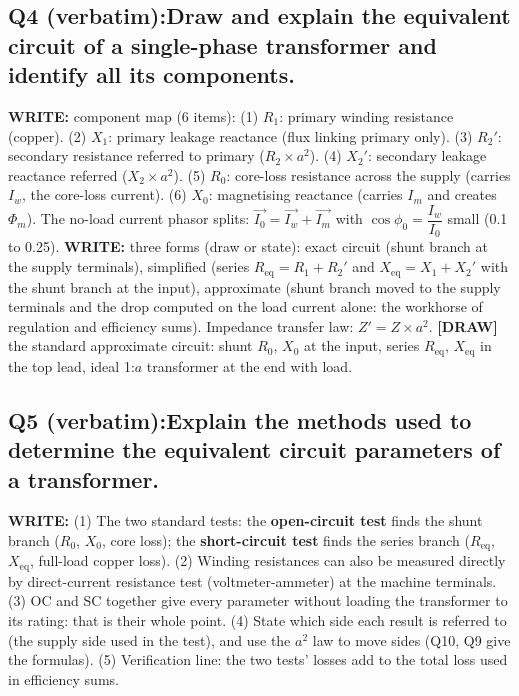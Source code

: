 \documentclass[11pt]{article}
\newcommand{\q}[2]{\subsection*{\color{copper}#1\quad\color{iron}#2}}
\newcommand{\w}[1]{\textbf{\color{copper}WRITE:} #1}
\newcommand{\dw}[1]{\textbf{\color{muted}[DRAW]} #1}
\begin{document}
\q{Q4 (verbatim):}{Draw and explain the equivalent circuit of a single-phase transformer and identify all its components.}
\w{component map (6 items):} (1) $R_1$: primary winding resistance (copper). (2) $X_1$: primary leakage reactance (flux linking primary only). (3) $R_2'$: secondary resistance referred to primary ($R_2 \times a^{2}$). (4) $X_2'$: secondary leakage reactance referred ($X_2 \times a^{2}$). (5) $R_0$: core-loss resistance across the supply (carries $I_w$, the core-loss current). (6) $X_0$: magnetising reactance (carries $I_m$ and creates $\Phi_m$). The no-load current phasor splits: $\vec{I_0} = \vec{I_w} + \vec{I_m}$ with $\cos\phi_0 = \dfrac{I_w}{I_0}$ small (0.1 to 0.25).
\w{three forms (draw or state):} exact circuit (shunt branch at the supply terminals), simplified (series $R_{\text{eq}} = R_1 + R_2'$ and $X_{\text{eq}} = X_1 + X_2'$ with the shunt branch at the input), approximate (shunt branch moved to the supply terminals and the drop computed on the load current alone: the workhorse of regulation and efficiency sums). Impedance transfer law: $Z' = Z \times a^{2}$.
\dw{the standard approximate circuit: shunt $R_0$, $X_0$ at the input, series $R_{\text{eq}}$, $X_{\text{eq}}$ in the top lead, ideal 1:$a$ transformer at the end with load.}

\q{Q5 (verbatim):}{Explain the methods used to determine the equivalent circuit parameters of a transformer.}
\w{(1) The two standard tests: the \textbf{open-circuit test} finds the shunt branch ($R_0$, $X_0$, core loss); the \textbf{short-circuit test} finds the series branch ($R_{\text{eq}}$, $X_{\text{eq}}$, full-load copper loss). (2) Winding resistances can also be measured directly by direct-current resistance test (voltmeter-ammeter) at the machine terminals. (3) OC and SC together give every parameter without loading the transformer to its rating: that is their whole point. (4) State which side each result is referred to (the supply side used in the test), and use the $a^{2}$ law to move sides (Q10, Q9 give the formulas). (5) Verification line: the two tests' losses add to the total loss used in efficiency sums.}
\end{document}
